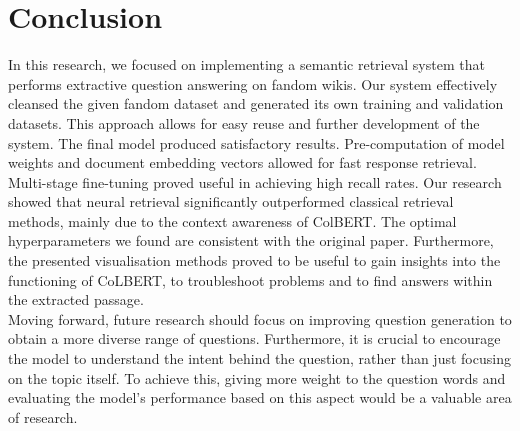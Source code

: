 \documentclass[11pt]{article}
\begin{document}
\section{Conclusion}
In this research, we focused on implementing a semantic retrieval system that performs extractive question answering on fandom wikis. Our system effectively cleansed the given fandom dataset and generated its own training and validation datasets. This approach allows for easy reuse and further development of the system. The final model produced satisfactory results. Pre-computation of model weights and document embedding vectors allowed for fast response retrieval. Multi-stage fine-tuning proved useful in achieving high recall rates. 
Our research showed that neural retrieval significantly outperformed classical retrieval methods, mainly due to the context awareness of ColBERT. 
The optimal hyperparameters we found are consistent with the original paper.
Furthermore, the presented visualisation methods proved to be useful to gain insights into the functioning of CoLBERT, to troubleshoot problems and to find answers within the extracted passage.
\\
Moving forward, future research should focus on improving question generation to obtain a more diverse range of questions. Furthermore, it is crucial to encourage the model to understand the intent behind the question, rather than just focusing on the topic itself. To achieve this, giving more weight to the question words and evaluating the model's performance based on this aspect would be a valuable area of research.





% 




\newpage
\ 
\newpage
\appendix
\label{sec:appendix}
\end{document}
